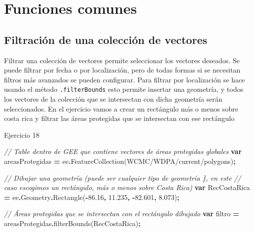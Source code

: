 \documentclass[
  12pt,
  letterpaper,
  twoside]{book}
\newenvironment{Shaded}{\begin{snugshade}}{\end{snugshade}}
\newcommand{\AttributeTok}[1]{\textcolor[rgb]{0.77,0.63,0.00}{#1}}
\newcommand{\CommentTok}[1]{\textcolor[rgb]{0.56,0.35,0.01}{\textit{#1}}}
\newcommand{\FloatTok}[1]{\textcolor[rgb]{0.00,0.00,0.81}{#1}}
\newcommand{\FunctionTok}[1]{\textcolor[rgb]{0.00,0.00,0.00}{#1}}
\newcommand{\KeywordTok}[1]{\textcolor[rgb]{0.13,0.29,0.53}{\textbf{#1}}}
\newcommand{\NormalTok}[1]{#1}
\newcommand{\OperatorTok}[1]{\textcolor[rgb]{0.81,0.36,0.00}{\textbf{#1}}}
\newcommand{\StringTok}[1]{\textcolor[rgb]{0.31,0.60,0.02}{#1}}
\begin{document}
\hypertarget{funciones-comunes-2}{%
\section{Funciones comunes}\label{funciones-comunes-2}}

\hypertarget{filtraciuxf3n-de-una-colecciuxf3n-de-vectores}{%
\subsection{Filtración de una colección de vectores}\label{filtraciuxf3n-de-una-colecciuxf3n-de-vectores}}

Filtrar una colección de vectores permite seleccionar los vectores deseados. Se puede filtrar por fecha o por localización, pero de todas formas si se necesitan filtros más avanzados se pueden configurar. Para filtrar por localización se hace usando el método \texttt{.filterBounds} esto permite insertar una geometría, y todos los vectores de la colección que se intersectan con dicha geometría serán seleccionados. En el ejercicio vamos a crear un rectángulo más o menos sobre costa rica y filtrar las áreas protegidas que se intersectan con ese rectángulo

Ejercicio 18

\begin{Shaded}
\begin{Highlighting}[]
\CommentTok{// Table dentro de GEE que contiene vectores de áreas protegidas globales}
\KeywordTok{var}\NormalTok{ areasProtegidas }\OperatorTok{=}\NormalTok{ ee}\OperatorTok{.}\FunctionTok{FeatureCollection}\NormalTok{(}\StringTok{\textquotesingle{}WCMC/WDPA/current/polygons\textquotesingle{}}\NormalTok{)}\OperatorTok{;} 

\CommentTok{// Dibujar una geometría (puede ser cualquier tipo de geometría \}, en este}
\CommentTok{// caso escogimos un rectángulo, más o menos sobre Costa Rica)}
\KeywordTok{var}\NormalTok{ RecCostaRica }\OperatorTok{=}\NormalTok{ ee}\OperatorTok{.}\AttributeTok{Geometry}\OperatorTok{.}\FunctionTok{Rectangle}\NormalTok{(}\OperatorTok{{-}}\FloatTok{86.16}\OperatorTok{,} \FloatTok{11.235}\OperatorTok{,} \OperatorTok{{-}}\FloatTok{82.601}\OperatorTok{,} \FloatTok{8.073}\NormalTok{)}\OperatorTok{;}

\CommentTok{// Áreas protegidas que se intersectan con el rectángulo dibujado}
\KeywordTok{var}\NormalTok{ filtro }\OperatorTok{=}\NormalTok{ areasProtegidas}\OperatorTok{.}\FunctionTok{filterBounds}\NormalTok{(RecCostaRica)}\OperatorTok{;}
\end{Highlighting}
\end{Shaded}
\end{document}
